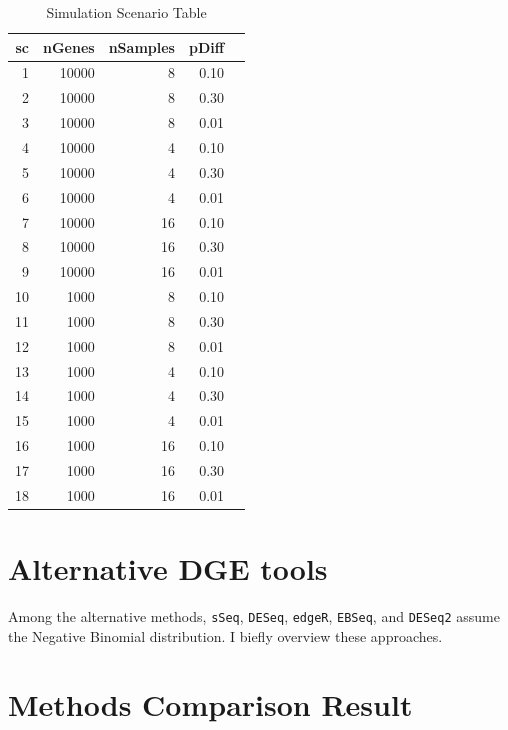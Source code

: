 \documentclass[11pt]{isuthesis}
\begin{document}
\begin{table}[H]
\centering
\begin{tabular}{|r|r|r|r|r|}
\hline
sc & nGenes & nSamples & pDiff \\ 
\hline
1 & 10000 & 8 & 0.10 \\ 
\hline
2 & 10000 & 8 & 0.30 \\ 
\hline
3 & 10000 & 8 & 0.01 \\
\hline
4 & 10000 & 4 & 0.10 \\
\hline
5 & 10000 & 4 & 0.30 \\
\hline
6 & 10000 & 4 & 0.01 \\ 
\hline
7 & 10000 & 16 & 0.10 \\
\hline
8 & 10000 & 16 & 0.30 \\ 
\hline
9 & 10000 & 16 & 0.01 \\
\hline
10& 1000 & 8 & 0.10 \\
\hline
11 & 1000 & 8 & 0.30 \\
\hline
12 & 1000 & 8 & 0.01 \\ 
\hline
13 & 1000 & 4 & 0.10 \\
\hline
14 & 1000 & 4 & 0.30 \\
\hline
15 & 1000 & 4 & 0.01 \\ 
\hline
16 & 1000 & 16 & 0.10 \\
\hline
17 & 1000 & 16 & 0.30 \\ 
\hline
18 & 1000 & 16 & 0.01 \\ 
\hline
\end{tabular}
\caption{Simulation Scenario Table}
\label{tab:Scenario}
\end{table}



\section{Alternative DGE tools}

Among the alternative methods, {\tt sSeq}\citep{10.1093/bioinformatics/btt143}, {\tt DESeq}\citep{anders2010differential}, {\tt edgeR}\citep{robinson2007moderated}\citep{robinson2010edger}, {\tt EBSeq}\citep{leng2013ebseq}, and {\tt DESeq2}\citep{love2014moderated} assume the Negative Binomial distribution. I biefly overview these approaches. 






\section{Methods Comparison Result}
\end{document}
